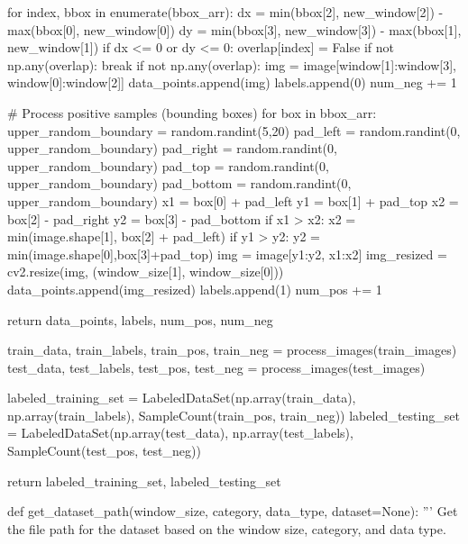 \begin{pythoncode}
                        for index, bbox in enumerate(bbox_arr):
                            dx = min(bbox[2], new_window[2]) - max(bbox[0], new_window[0])
                            dy = min(bbox[3], new_window[3]) - max(bbox[1], new_window[1])
                            if dx <= 0 or dy <= 0:
                                overlap[index] = False
                        if not np.any(overlap):
                            break
                    if not np.any(overlap):
                        img = image[window[1]:window[3], window[0]:window[2]]
                        data_points.append(img)
                        labels.append(0)
                        num_neg += 1

            # Process positive samples (bounding boxes)
            for box in bbox_arr:
                upper_random_boundary = random.randint(5,20)
                pad_left = random.randint(0, upper_random_boundary)
                pad_right = random.randint(0, upper_random_boundary)
                pad_top = random.randint(0, upper_random_boundary)
                pad_bottom = random.randint(0, upper_random_boundary)
                x1 = box[0] + pad_left
                y1 = box[1] + pad_top
                x2 = box[2] - pad_right
                y2 = box[3] - pad_bottom
                if x1 > x2:
                    x2 = min(image.shape[1], box[2] + pad_left)
                if y1 > y2:
                    y2 = min(image.shape[0],box[3]+pad_top)
                img = image[y1:y2, x1:x2]
                img_resized = cv2.resize(img, (window_size[1], window_size[0]))
                data_points.append(img_resized)
                labels.append(1)
                num_pos += 1


        return data_points, labels, num_pos, num_neg

    train_data, train_labels, train_pos, train_neg = process_images(train_images)
    test_data, test_labels, test_pos, test_neg = process_images(test_images)


    labeled_training_set = LabeledDataSet(np.array(train_data), np.array(train_labels), SampleCount(train_pos, train_neg))
    labeled_testing_set = LabeledDataSet(np.array(test_data), np.array(test_labels), SampleCount(test_pos, test_neg))

    return labeled_training_set, labeled_testing_set


def get_dataset_path(window_size, category, data_type, dataset=None):
    '''
    Get the file path for the dataset based on the window size, category, and data type.


\end{pythoncode}
